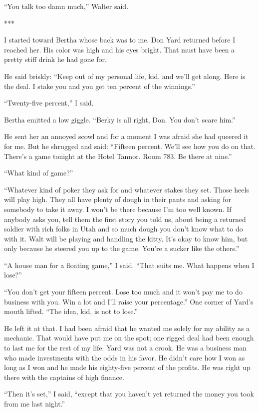 {“You talk too damn much,” Walter said.

***

I started toward Bertha whose back was to me. Don Yard returned before I reached her. His color was high and his eyes bright. That must have been a pretty stiff drink he had gone for.

He said briskly: “Keep out of my personal life, kid, and we’ll get along. Here is the deal. I stake you and you get ten percent of the winnings.”

“Twenty-five percent,” I said.

Bertha emitted a low giggle. “Berky is all right, Don. You don’t scare him.”

He sent her an annoyed scowl and for a moment I was afraid she had queered it for me. But he shrugged and said: “Fifteen percent. We’ll see how you do on that. There’s a game tonight at the Hotel Tannor. Room 783. Be there at nine.”

“What kind of game?”

“Whatever kind of poker they ask for and whatever stakes they set. Those heels will play high. They all have plenty of dough in their pants and asking for somebody to take it away. I won’t be there because I’m too well known. If anybody asks you, tell them the first story you told us, about being a returned soldier with rich folks in Utah and so much dough you don’t know what to do with it. Walt will be playing and handling the kitty. It’s okay to know him, but only because he steered you up to the game. You’re a sucker like the others.”

“A house man for a floating game,” I said. “That suits me. What happens when I lose?”

“You don’t get your fifteen percent. Lose too much and it won’t pay me to do business with you. Win a lot and I’ll raise your percentage.” One corner of Yard’s mouth lifted. “The idea, kid, is not to lose.”

He left it at that. I had been afraid that he wanted me solely for my ability as a mechanic. That would have put me on the spot; one rigged deal had been enough to last me for the rest of my life. Yard was not a crook. He was a business man who made investments with the odds in his favor. He didn’t care how I won as long as I won and he made his eighty-five percent of the profits. He was right up there with the captains of high finance.

“Then it’s set,” I said, “except that you haven’t yet returned the money you took from me last night.”

}
